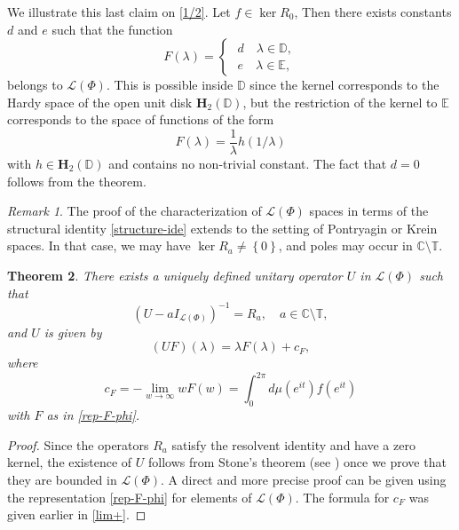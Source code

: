 \documentclass[12pt]{amsart}
\newtheorem{thm}{Theorem}[section]
\theoremstyle{definition}
\theoremstyle{remark}
\newtheorem{rem}[thm]{Remark}
\numberwithin{equation}{section}
\begin{document}
          We illustrate this last claim on \eqref{1/2}. Let $f\in\ker R_0$, Then there exists constants $d$ and $e$ such that
            the function
            \[
              F({\lambda})=\begin{cases}\,\,d\quad {\lambda}\in\mathbb D,\\
                \,\,e\quad {\lambda}\in\mathbb E,\end{cases}
            \]
            belongs to $\mathcal L(\Phi)$. This is possible inside $\mathbb D$ since the kernel corresponds to the Hardy space of the open unit disk
            $\mathbf H_2(\mathbb D)$, but the restriction of
            the kernel to $\mathbb E$ corresponds to the space of functions of the form
\[
  F({\lambda})=\frac{1}{{\lambda}}h(1/{\lambda})
\]
with $h\in\mathbf H_2(\mathbb D)$ and contains no non-trivial constant. The fact that $d=0$ follows from the theorem.

\begin{rem}
  The proof of the characterization of $\mathcal L(\Phi)$ spaces in terms of the structural identity \eqref{structure-ide} extends to  the setting of Pontryagin or Krein spaces.
  In that case, we may have $\ker R_a\not=\left\{0\right\}$, and poles may occur in $\mathbb C\setminus\mathbb T$.
  \end{rem}

        \begin{thm}
          There exists a uniquely defined unitary operator $U$ in $\mathcal L(\Phi)$ such that
          \begin{equation}
            (U-aI_{\mathcal L(\Phi)})^{-1}=R_a,\quad a\in\mathbb C\setminus\mathbb T,
          \end{equation}
          and $U$ is given by
          \begin{equation}
            (UF)({\lambda})={\lambda}F({\lambda})+c_F,
          \end{equation}
          where
          \begin{equation}
c_F=-\lim_{w\rightarrow\infty}wF(w)=\int_0^{2\pi}d\mu(e^{it})f(e^{it})
\end{equation}
with $F$ as in \eqref{rep-F-phi}.
          \end{thm}

          \begin{proof}
Since the operators $R_a$ satisfy the resolvent identity and have a zero kernel, the existence of $U$ follows from Stone's theorem
            (see \cite[Theorem 4.10 p. 137]{Stone}) once we prove that they are bounded in $\mathcal L(\Phi)$.
            A direct and more precise proof can be given using the representation \eqref{rep-F-phi} for elements of $\mathcal L(\Phi)$. The formula for $c_F$ was given earlier in
            \eqref{lim+}.
           \end{proof}
\end{document}
